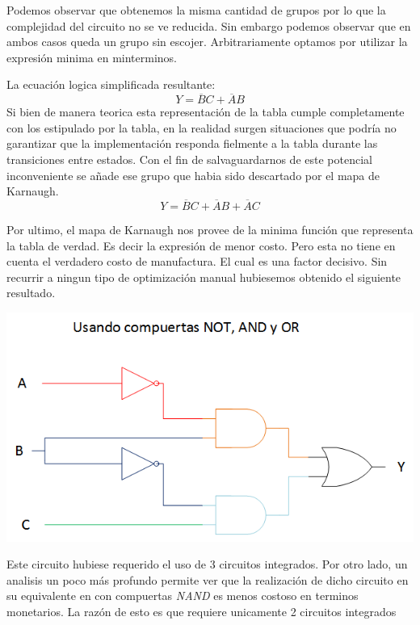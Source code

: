 Podemos observar que obtenemos la misma cantidad de grupos por lo que la complejidad del circuito no se ve reducida.
Sin embargo podemos observar que en ambos casos queda un grupo sin escojer.
Arbitrariamente optamos por utilizar la expresión minima en minterminos.
\begin{center}
 	\begin{Karnaughvuit}
    \end{Karnaughvuit}
\end{center}
La ecuación logica simplificada resultante:
	$$ 
		Y = \overline{B}C +  \overline{A}B
	$$
Si bien de manera teorica esta representación de la tabla cumple completamente con los estipulado por la tabla, en la realidad surgen situaciones que podría no garantizar que la implementación responda fielmente a la tabla durante las transiciones entre estados. 
Con el fin de salvaguardarnos de este potencial inconveniente se añade ese grupo que habia sido descartado por el mapa de Karnaugh.
	$$
		Y = \overline{B}C +  \overline{A}B + \overline{A}C
	$$
 
Por ultimo, el mapa de Karnaugh nos provee de la minima función que representa la tabla de verdad. Es decir la expresión de menor costo. Pero esta no tiene en cuenta el verdadero costo de manufactura. El cual es una factor decisivo. 
Sin recurrir a ningun tipo de optimización manual hubiesemos obtenido el siguiente resultado.
\begin{center}
	\includegraphics[scale=0.8]{../3-TruthTable/Circuito AND, OR ,NOT.png}
\end{center}
Este circuito hubiese requerido el uso de 3 circuitos integrados. 
Por otro lado, un analisis un poco más profundo permite ver que la realización de dicho circuito en su equivalente en con compuertas \emph{NAND} es menos costoso en terminos monetarios. La razón de esto es que requiere unicamente 2 circuitos integrados

